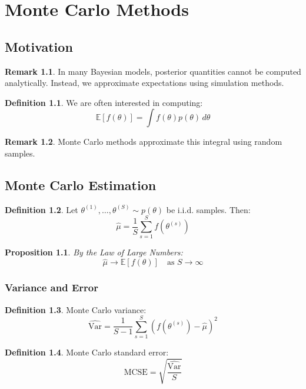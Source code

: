 \documentclass[12pt,oneside]{book}
\numberwithin{equation}{section}
\theoremstyle{definition}
\newtheorem{definition}{Definition}[section]
\newtheorem{remark}{Remark}[section]
\theoremstyle{plain}
\newtheorem{proposition}{Proposition}[section]
\theoremstyle{remark}
\newcommand{\E}{\mathbb{E}}
\newcommand{\Var}{\mathrm{Var}}
\begin{document}
\chapter{Monte Carlo Methods}

\section{Motivation}

\begin{remark}
In many Bayesian models, posterior quantities cannot be computed analytically. Instead, we approximate expectations using simulation methods.
\end{remark}

\begin{definition}
We are often interested in computing:
$$
\E[f(\theta)] = \int f(\theta)p(\theta)\,d\theta
$$
\end{definition}

\begin{remark}
Monte Carlo methods approximate this integral using random samples.
\end{remark}

\section{Monte Carlo Estimation}

\begin{definition}
Let $\theta^{(1)},\dots,\theta^{(S)} \sim p(\theta)$ be i.i.d. samples. Then:
$$
\hat{\mu} = \frac{1}{S}\sum_{s=1}^S f(\theta^{(s)})
$$
\end{definition}

\begin{proposition}
By the Law of Large Numbers:
$$
\hat{\mu} \to \E[f(\theta)] \quad \text{as } S \to \infty
$$
\end{proposition}

\subsection{Variance and Error}

\begin{definition}
Monte Carlo variance:
$$
\widehat{\Var} = \frac{1}{S-1}\sum_{s=1}^S \left(f(\theta^{(s)}) - \hat{\mu}\right)^2
$$
\end{definition}

\begin{definition}
Monte Carlo standard error:
$$
\text{MCSE} = \sqrt{\frac{\widehat{\Var}}{S}}
$$
\end{definition}
\end{document}
